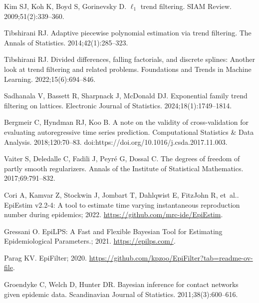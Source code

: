 \documentclass[10pt,letterpaper]{article}
\begin{document}
\begin{thebibliography}{10}
  Kim SJ, Koh K, Boyd S, Gorinevsky D.
  \newblock $\ell_1$ trend filtering.
  \newblock SIAM Review. 2009;51(2):339--360.
  
  Tibshirani RJ.
  \newblock Adaptive piecewise polynomial estimation via trend filtering.
  \newblock The Annals of Statistics. 2014;42(1):285--323.
  
  Tibshirani RJ.
  \newblock Divided differences, falling factorials, and discrete splines:
    Another look at trend filtering and related problems.
  \newblock Foundations and Trends{\textregistered} in Machine Learning.
    2022;15(6):694--846.
  
  Sadhanala V, Bassett R, Sharpnack J, McDonald DJ.
  \newblock Exponential family trend filtering on lattices.
  \newblock Electronic Journal of Statistics. 2024;18(1):1749--1814.
  
  Bergmeir C, Hyndman RJ, Koo B.
  \newblock A note on the validity of cross-validation for evaluating
    autoregressive time series prediction.
  \newblock Computational Statistics \& Data Analysis. 2018;120:70--83.
  \newblock doi:{https://doi.org/10.1016/j.csda.2017.11.003}.
  
  Vaiter S, Deledalle C, Fadili J, Peyr{\'e} G, Dossal C.
  \newblock The degrees of freedom of partly smooth regularizers.
  \newblock Annals of the Institute of Statistical Mathematics. 2017;69:791--832.
  
  Cori A, Kamvar Z, Stockwin J, Jombart T, Dahlqwist E, FitzJohn R, et~al..
    {EpiEstim v2.2-4: A tool to estimate time varying instantaneous reproduction
    number during epidemics}; 2022.
  \newblock \url{https://github.com/mrc-ide/EpiEstim}.
  
  Gressani O. {EpiLPS: {A} {F}ast and {F}lexible {B}ayesian {T}ool for
    {E}stimating {E}pidemiological {P}arameters.}; 2021.
  \newblock \url{https://epilps.com/}.
  
  Parag KV. {EpiFilter}; 2020.
  \newblock \url{https://github.com/kpzoo/EpiFilter?tab=readme-ov-file}.
  
  Groendyke C, Welch D, Hunter DR.
  \newblock Bayesian inference for contact networks given epidemic data.
  \newblock Scandinavian Journal of Statistics. 2011;38(3):600--616.
  

\end{thebibliography}
\end{document}
